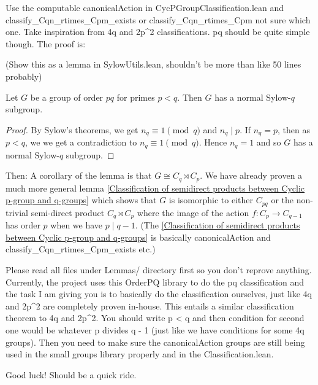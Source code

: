 Use the computable canonicalAction in CycPGroupClassification.lean and classify_Cqn_rtimes_Cpm_exists or classify_Cqn_rtimes_Cpm not sure which one. Take inspiration from 4q and 2p^2 classifications. pq should be quite simple though. The proof is:

(Show this as a lemma in SylowUtils.lean, shouldn't be more than like 50 lines probably)
\begin{lemma}
    Let $G$ be a group of order $pq$ for primes $p < q$. Then $G$ has a normal Sylow-$q$ subgroup.
\end{lemma}
\begin{proof}
    By Sylow's theorems, we get $n_q \equiv 1 \pmod q$ and $n_q \mid p$. If $n_q = p$, then as $p < q$, we we get a contradiction to $n_q \equiv 1 \pmod q$. Hence $n_q = 1$ and so $G$ has a normal Sylow-$q$ subgroup.
\end{proof}

Then: A corollary of the lemma is that $G \cong C_q \rtimes C_p$. We have already proven a much more general lemma \ref{Classification of semidirect products between Cyclic p-group and q-groups} which shows that $G$ is isomorphic to either $C_{pq}$ or the non-trivial semi-direct product $C_q \rtimes C_p$ where the image of the action $f : C_p \rightarrow C_{q - 1}$ has order $p$ when we have $p \mid q - 1$.
(The \ref{Classification of semidirect products between Cyclic p-group and q-groups} is basically canonicalAction and classify_Cqn_rtimes_Cpm_exists etc.)

Please read all files under Lemmas/ directory first so you don't reprove anything. Currently, the project uses this OrderPQ library to do the pq classification and the task I am giving you is to basically do the classification ourselves, just like 4q and 2p^2 are completely proven in-house. This entails a similar classification theorem to 4q and 2p^2. You should write p < q and then condition for second one would be whatever p divides q - 1 (just like we have conditions for some 4q groups). Then you need to make sure the canonicalAction groups are still being used in the small groups library properly and in the Classification.lean.

Good luck! Should be a quick ride.